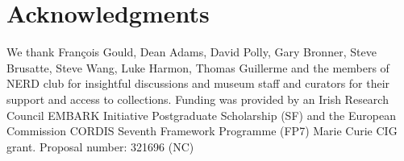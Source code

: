 \documentclass[12pt,a4paper]{article}
\begin{document}
 
	
\section{Acknowledgments}

	We thank Fran\c{c}ois Gould, Dean Adams, David Polly, Gary Bronner, Steve Brusatte, Steve Wang, Luke Harmon, Thomas Guillerme and the members of NERD club for insightful discussions and museum staff and curators %
	for their support and access to collections. Funding was provided by an Irish Research Council EMBARK Initiative Postgraduate Scholarship (SF) and the European Commission CORDIS Seventh Framework Programme (FP7) Marie Curie CIG grant. Proposal number: 321696 (NC)





\end{document}

